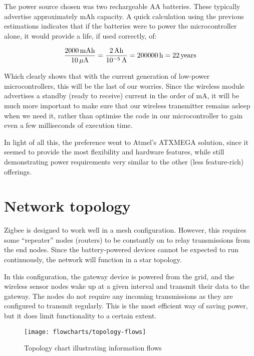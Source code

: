The power source chosen was two rechargeable AA batteries. These typically
advertise approximately \unit[2000]{mAh} capacity. A quick calculation using the
previous estimations indicates that if the batteries were to power the
microcontroller alone, it would provide a life, if used correctly, of:

\begin{equation}
  \frac{\unit[2000]{mAh}}{\unit[10]{\mu{}A}} = 
  \frac{\unit[2]{Ah}}{\unit[10^{-5}]{A}} =
  \unit[200000]{h} = \unit[22]{years}
  \label{eq:battery-life}
\end{equation}

Which clearly shows that with the current generation of low-power
microcontrollers, this will be the last of our worries. Since the wireless
module advertises a standby (ready to receive) current in the order of
\unit[50]{mA}, it will be much more important to make sure that our wireless
transmitter remains asleep when we need it, rather than optimise the code in our
microcontroller to gain even a few milliseconds of execution time.

In light of all this, the preference went to Atmel's ATXMEGA solution, since it
seemed to provide the most flexibility and hardware features, while still
demonstrating power requirements very similar to the other (less feature-rich)
offerings.


\pagebreak
\section{Network topology}
\label{sec:network-topology}

Zigbee is designed to work well in a mesh configuration. However, this requires
some ``repeater'' nodes (routers) to be constantly on to relay transmissions
from the end nodes. Since the battery-powered devices cannot be expected to run
continuously, the network will function in a star topology.

In this configuration, the gateway device is powered from the grid, and the
wireless sensor nodes wake up at a given interval and transmit their data to the
gateway. The nodes do not require any incoming transmissions as they are
configured to transmit regularly. This is the most efficient way of saving
power, but it does limit functionality to a certain extent.

\begin{figure}[h]
  \begin{center}
    \texttt{[image: flowcharts/topology-flows]}
  \end{center}
  \caption{Topology chart illustrating information flows}
  \label{fig:topology-flows}
\end{figure}


